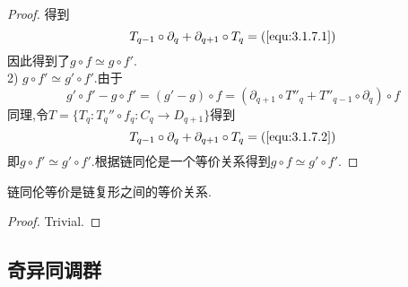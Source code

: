 \documentclass{article}
\begin{document}
\begin{proof}
    得到
    $$
    T_{q-1} \circ \partial_q + \partial_{q+1}\circ T_q = (\ref{equ:3.1.7.1})
    $$
    因此得到了$g \circ f \simeq g \circ f'$.\\
    2) $g \circ f' \simeq g' \circ f'$.由于
    \begin{equation}
        g' \circ f' - g \circ f' = (g' - g)\circ f = (\partial_{q+1}\circ T''_q + T''_{q-1}\circ \partial_{q})\circ f
        \tag{2}
        \label{equ:3.1.7.2}
    \end{equation}
    同理,令$T =\{T_q : T_q'' \circ f_q: C_q \to D_{q+1}\}$得到
    $$
    T_{q-1} \circ \partial_q + \partial_{q+1}\circ T_q = (\ref{equ:3.1.7.2})
    $$
    即$g \circ f' \simeq g' \circ f'$.根据链同伦是一个等价关系得到$g \circ f \simeq g' \circ f'$.
\end{proof}
\begin{proposition}
    链同伦等价是链复形之间的等价关系.
\end{proposition}
\begin{proof}
    Trivial.
\end{proof}
\subsection{奇异同调群}
\end{document}
